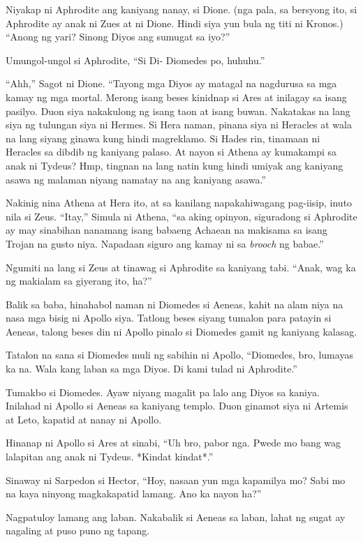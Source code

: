 \documentclass[12pt,letterpaper]{report}
\begin{document}
Niyakap ni Aphrodite ang kaniyang nanay, si Dione. (nga pala, sa bersyong ito, si Aphrodite ay anak ni Zues at ni Dione. Hindi siya yun bula ng titi ni Kronos.) ``Anong ng yari? Sinong Diyos ang sumugat sa iyo?''

Umungol-ungol si Aphrodite, ``Si Di- Diomedes po, huhuhu.''

``Ahh,'' Sagot ni Dione. ``Tayong mga Diyos ay matagal na nagdurusa sa mga kamay ng mga mortal. Merong isang beses kinidnap si Ares at inilagay sa isang pasilyo. Duon siya nakakulong ng isang taon at isang buwan. Nakatakas na lang siya ng tulungan siya ni Hermes. Si Hera naman, pinana siya ni Heracles at wala na lang siyang ginawa kung hindi magreklamo. Si Hades rin, tinamaan ni Heracles sa dibdib ng kaniyang palaso. At nayon si Athena ay kumakampi sa anak ni Tydeus? Hmp, tingnan na lang natin kung hindi umiyak ang kaniyang asawa ng malaman niyang namatay na ang kaniyang asawa.''

Nakinig nina Athena at Hera ito, at sa kanilang napakahiwagang pag-iisip, inuto nila si Zeus. ``Itay,'' Simula ni Athena, ``sa aking opinyon, siguradong si Aphrodite ay may sinabihan nanamang isang babaeng Achaean na makisama sa isang Trojan na gusto niya. Napadaan siguro ang kamay ni sa \textit{brooch} ng babae.''

Ngumiti na lang si Zeus at tinawag si Aphrodite sa kaniyang tabi. ``Anak, wag ka ng makialam sa giyerang ito, ha?''

Balik sa baba, hinahabol naman ni Diomedes si Aeneas, kahit na alam niya na nasa mga bisig ni Apollo siya. Tatlong beses siyang tumalon para patayin si Aeneas, talong beses din ni Apollo pinalo si Diomedes gamit ng kaniyang kalasag.

Tatalon na sana si Diomedes muli ng sabihin ni Apollo, ``Diomedes, bro, lumayas ka na. Wala kang laban sa mga Diyos. Di kami tulad ni Aphrodite.''

Tumakbo si Diomedes. Ayaw niyang magalit pa lalo ang Diyos sa kaniya. Inilahad ni Apollo si Aeneas sa kaniyang templo. Duon ginamot siya ni Artemis at Leto, kapatid at nanay ni Apollo.

Hinanap ni Apollo si Ares at sinabi, ``Uh bro, pabor nga. Pwede mo bang wag lalapitan ang anak ni Tydeus. *Kindat kindat*.''

Sinaway ni Sarpedon si Hector, ``Hoy, nasaan yun mga kapamilya mo? Sabi mo na kaya ninyong magkakapatid lamang. Ano ka nayon ha?''

Nagpatuloy lamang ang laban. Nakabalik si Aeneas sa laban, lahat ng sugat ay nagaling at puso puno ng tapang.
\end{document}
